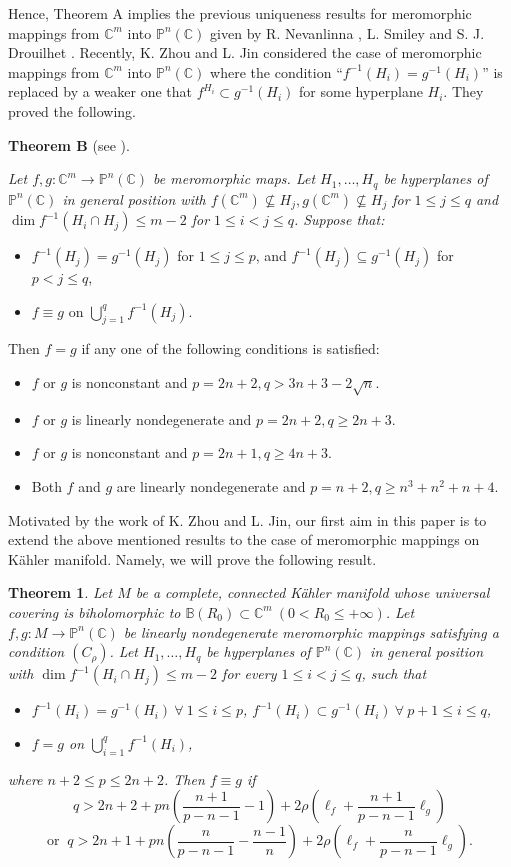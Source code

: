 \documentclass[12pt, a4paper, oneside]{amsart}
\newtheorem{theorem}[equation]{Theorem}
\newcommand{\C}{{\mathbb{C}}}
\newcommand{\B}{\mathbb{B}}
\renewcommand{\P}{{\mathbb{P}}}
\numberwithin{equation}{section}
\begin{document}
Hence, Theorem A implies the previous uniqueness results for meromorphic mappings from $\C^m$ into $\P^n(\C)$ given by R. Nevanlinna \cite{N}, L. Smiley \cite{S} and S. J. Drouilhet \cite{D}. Recently, K. Zhou and L. Jin \cite{Zhou} considered the case of meromorphic mappings from $\C^m$ into $\P^n(\C)$ where the condition ``$f^{-1}(H_i)=g^{-1}(H_i)$'' is replaced by a weaker one that $f^{H_i}\subset g^{-1}(H_i)$ for some hyperplane $H_i$. They proved the following.

\vskip0.1cm
\noindent
{\bf Theorem B} (see \cite[Theorem 1.1]{Zhou}). {\it Let $f, g: \C^m \rightarrow \P^n(\C)$ be meromorphic maps. Let $H_1, \ldots, H_q$ be hyperplanes of $\P^n(\C)$ in general position with $f(\C^m) \nsubseteq H_j, g(\C^m) \nsubseteq H_j$ for $1 \leq j \leq q$ and $\dim f^{-1}(H_i \cap H_j) \leq m-2$ for $1 \leq i<j \leq q$. Suppose that:
\begin{itemize}
\item[(a)] $f^{-1}(H_j)=g^{-1}(H_j)$ for $1 \leq j \leq p$, and $f^{-1}(H_j) \subseteq g^{-1}(H_j)$ for $p<j \leq q$,
\item[(b)] $f\equiv g$ on $\bigcup_{j=1}^q f^{-1}(H_j)$.
\end{itemize}
Then $f=g$ if any one of the following conditions is satisfied:
\begin{itemize}
\item[(i)] $f$ or $g$ is nonconstant and $p=2 n+2, q>3 n+3-2 \sqrt{n}$.
\item[(ii)] $f$ or $g$ is linearly nondegenerate and $p=2 n+2, q \geq 2 n+3$.
\item[(iii)] $f$ or $g$ is nonconstant and $p=2 n+1, q \geq 4 n+3$.
\item[(iv)] Both $f$ and $g$ are linearly nondegenerate and $p=n+2, q \geq n^3+n^2+n+4$.
\end{itemize}}

Motivated by the work of K. Zhou and L. Jin, our first aim in this paper is to extend the above mentioned results to the case of meromorphic mappings on K\"{a}hler manifold. Namely, we will prove the following result.
\begin{theorem}\label{1.1}
Let $M$ be a complete, connected K\"{a}hler manifold whose universal covering is biholomorphic to $\B(R_0) \subset \C^m\ (0<R_0\le +\infty)$. Let $f, g: M \rightarrow\P^n(\C)$ be linearly nondegenerate meromorphic mappings satisfying a condition $(C_{\rho})$. Let $H_1,\ldots,H_q$ be hyperplanes of $\P^n(\C)$ in general position with $\dim f^{-1}(H_i\cap H_j)\le m-2$ for every $1\le i<j\le q$, such that
\begin{itemize}
\item[(i)] $f^{-1}(H_i)=g^{-1}(H_i)\ \forall\ 1\le i\le p$, $f^{-1}(H_i)\subset g^{-1}(H_i)\ \forall\ p+1\le i\le q$, 
\item[(ii)] $f=g$ on $\bigcup_{i=1}^qf^{-1}(H_i)$, 
\end{itemize}
where $n+2\le p\le 2n+2$. Then $f\equiv g$ if 
$$q>2n+2+pn\left(\frac{n+1}{p-n-1}-1\right)+2\rho\left(\ell_f+\frac{n+1}{p-n-1}\ell_g\right)$$
$$\text{or }\ q>2n+1+pn\left(\frac{n}{p-n-1}-\frac{n-1}{n}\right)+2\rho\left(\ell_f+\frac{n}{p-n-1}\ell_g\right).$$
\end{theorem}
\end{document}
